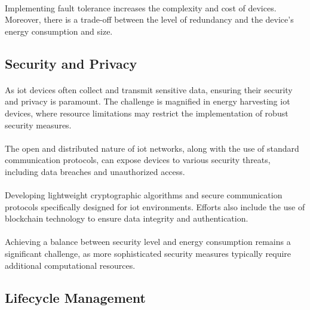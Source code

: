         \paragraph{}
        Implementing fault tolerance increases the complexity and cost of devices. Moreover, there is a trade-off between the level of redundancy and the device's energy consumption and size.

    \subsection{Security and Privacy}
    
        \paragraph{}
        As \gls{iot} devices often collect and transmit sensitive data, ensuring their security and privacy is paramount. The challenge is magnified in energy harvesting \gls{iot} devices, where resource limitations may restrict the implementation of robust security measures.
        
        \paragraph{}
        The open and distributed nature of \gls{iot} networks, along with the use of standard communication protocols, can expose devices to various security threats, including data breaches and unauthorized access.
        
        \paragraph{}
        Developing lightweight cryptographic algorithms and secure communication protocols specifically designed for \gls{iot} environments. Efforts also include the use of blockchain technology to ensure data integrity and authentication\cite{iotSecurity}.
        
        \paragraph{}
        Achieving a balance between security level and energy consumption remains a significant challenge, as more sophisticated security measures typically require additional computational resources.

    \subsection{Lifecycle Management}
    
